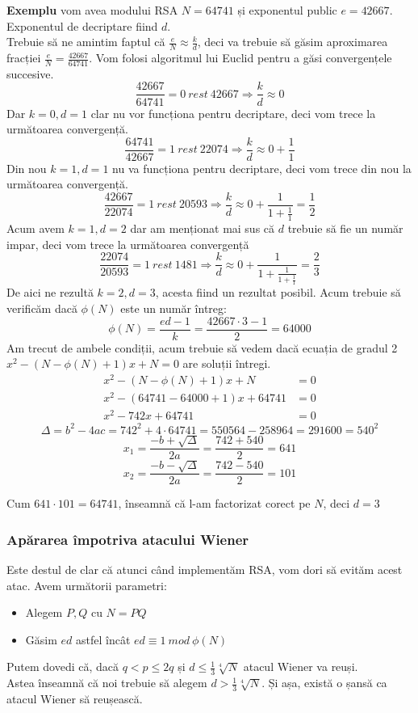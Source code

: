 \documentclass[12pt, oneside]{book}
\begin{document}
\textbf{Exemplu} vom avea modului RSA $N=64741$ și exponentul public $e=42667$. Exponentul de decriptare fiind $d$.\\
Trebuie să ne amintim faptul că $ \frac{e}{N} \approx \frac{k}{d}$, deci va trebuie să găsim aproximarea fracției $\frac{e}{N} = \frac{42667}{64741}$. Vom folosi algoritmul lui Euclid pentru a găsi convergențele succesive. \\
$$\frac{42667}{64741}= 0 \ rest \ 42667 \Rightarrow \frac{k}{d} \approx 0 $$
Dar $k=0, d=1$ clar nu vor funcționa pentru decriptare, deci vom trece la următoarea convergență.
$$ \frac{64741}{42667} = 1 \ rest \ 22074 \Rightarrow \frac{k}{d} \approx 0 + \frac{1}{1}$$
Din nou $k=1,d=1$ nu va funcționa pentru decriptare, deci vom trece din nou la următoarea convergență.
$$ \frac{42667}{22074} = 1 \ rest \ 20593 \Rightarrow \frac{k}{d} \approx 0 + \frac{1}{1+\frac{1}{1}} = \frac{1}{2}$$ 
Acum avem $k=1,d=2$ dar am menționat mai sus că $d$ trebuie să fie un număr impar, deci vom trece la următoarea convergență
$$ \frac{22074}{20593} = 1 \ rest \ 1481 \Rightarrow \frac{k}{d} \approx 0 + \frac{1}{1 + \frac{1}{1+\frac{1}{1}}} = \frac{2}{3} $$ 
De aici ne rezultă $k=2,d=3$, acesta fiind un rezultat posibil. Acum trebuie să verificăm dacă $\phi(N)$ este un număr întreg:
$$\phi(N)=\frac{ed-1}{k}=\frac{42667 \cdot   3 -1}{2}=64000$$
Am trecut de ambele condiții, acum trebuie să vedem dacă ecuația de gradul 2 $x^2 - (N- \phi(N) +1)x +N=0$ are soluții întregi.
\begin{align*}
x^2 - (N- \phi(N)+1)x+N&=0\\
x^2 - (64741 - 64000 +1)x + 64741&=0\\
x^2 - 742x + 64741&=0
\end{align*}
$$ \Delta = b^2 - 4ac = 742^2 + 4 \cdot 64741 = 550564 - 258964 = 291600 = 540^{2} $$
$$x_1 = \frac{-b + \sqrt{\Delta}}{2a} = \frac{742 + 540}{2} = 641$$ 
$$x_2 = \frac{-b - \sqrt{\Delta}}{2a} = \frac{742 - 540}{2} = 101$$

Cum $641 \cdot   101 = 64741$, înseamnă că l-am factorizat corect pe $N$, deci $d=3$
\subsubsection{Apărarea împotriva atacului Wiener}
Este destul de clar că atunci când implementăm RSA, vom dori să evităm acest atac. Avem următorii parametri: \\
\begin{itemize}
\item Alegem $P,Q$ cu $N=PQ$

\item Găsim $ed$ astfel încât $ed \equiv 1 \ mod \ \phi(N)$

\end{itemize}
Putem dovedi că, dacă $q<p \leq 2q$ și $ d \leq \frac{1}{3} \sqrt[4]{N}$ atacul Wiener va reuși. \\
Astea înseamnă că noi trebuie să alegem $d > \frac{1}{3} \sqrt[4]{N}$. Și așa, există o șansă ca atacul Wiener să reușească.
\end{document}
